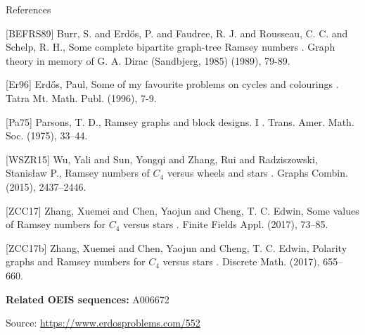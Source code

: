 \documentclass{article}
\begin{document}
References

[BEFRS89] Burr, S. and Erd\H{o}s, P. and Faudree, R. J. and Rousseau, C. C. and Schelp, R. H., Some complete bipartite graph-tree Ramsey numbers . Graph theory in memory of G. A. Dirac (Sandbjerg, 1985) (1989), 79-89.

[Er96] Erd\H{o}s, Paul, Some of my favourite problems on cycles and colourings . Tatra Mt. Math. Publ. (1996), 7-9.

[Pa75] Parsons, T. D., Ramsey graphs and block designs. I . Trans. Amer. Math. Soc. (1975), 33--44.

[WSZR15] Wu, Yali and Sun, Yongqi and Zhang, Rui and Radziszowski, Stanis\l aw P., Ramsey numbers of {$C_4$} versus wheels and stars . Graphs Combin. (2015), 2437--2446.

[ZCC17] Zhang, Xuemei and Chen, Yaojun and Cheng, T. C. Edwin, Some values of {R}amsey numbers for {$C_4$} versus stars . Finite Fields Appl. (2017), 73--85.

[ZCC17b] Zhang, Xuemei and Chen, Yaojun and Cheng, T. C. Edwin, Polarity graphs and {R}amsey numbers for {$C_4$} versus stars . Discrete Math. (2017), 655--660.

\noindent\textbf{Related OEIS sequences:} A006672


\bigskip
\noindent\small{Source: \url{https://www.erdosproblems.com/552}}
\end{document}
